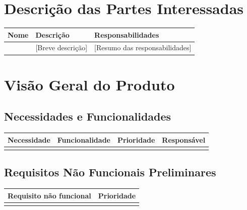 \documentclass[12pt,a4paper]{report}
\begin{document}
\chapter{Descrição das Partes Interessadas}
\begin{center}
\begin{tabularx}{\textwidth}{|l|X|X|}
    \hline
    \textbf{Nome} & \textbf{Descrição} & \textbf{Responsabilidades} \\ \hline
    [Nome da Parte] & [Breve descrição] & [Resumo das responsabilidades] \\ \hline
\end{tabularx}
\end{center}

\chapter{Visão Geral do Produto}

\section{Necessidades e Funcionalidades}
\begin{center}
\begin{tabularx}{\textwidth}{|X|X|l|l|}
    \hline
    \textbf{Necessidade} & \textbf{Funcionalidade} & \textbf{Prioridade} & \textbf{Responsável} \\ \hline
    & & & \\ \hline
\end{tabularx}
\end{center}

\section{Requisitos Não Funcionais Preliminares}
\begin{center}
\begin{tabularx}{\textwidth}{|X|l|}
    \hline
    \textbf{Requisito não funcional} & \textbf{Prioridade} \\ \hline
    & \\ \hline
\end{tabularx}
\end{center}
\end{document}
